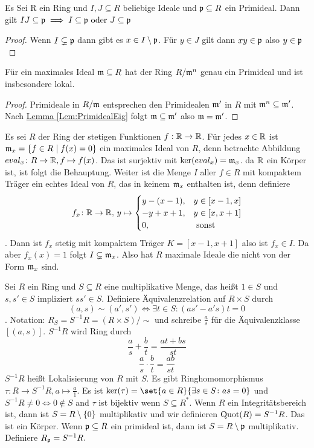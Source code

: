 \begin{Lemma}\label{Lem:PrimidealEig}
    Es Sei R ein Ring und $I,J\subseteq R$ beliebige Ideale und $\mathfrak{p}\subseteq R$ ein Primideal. Dann gilt 
    $IJ\subseteq \mathfrak{p}\implies I\subseteq\mathfrak{p} \text{ oder } J\subseteq\mathfrak{p}$
\end{Lemma}
\begin{proof}
    Wenn $I\subsetneq \mathfrak{p}$ dann gibt es $x\in I\setminus\mathfrak{p}$. Für $y\in J$ gilt dann $xy\in\mathfrak{p}$ also $y\in\mathfrak{p}$
\end{proof}
\begin{Kor}
    Für ein maximales Ideal $\mathfrak{m}\subseteq R$ hat der Ring $R/\mathfrak{m}^n$ genau ein Primideal und ist insbesondere lokal.
\end{Kor}
\begin{proof}
    Primideale in $R/\mathfrak{m}$ entsprechen den Primidealen $\mathfrak{m}'$ in $R$ mit $\mathfrak{m}^n\subseteq \mathfrak{m}'$. Nach \hyperref[Lem:PrimidealEig]{Lemma \ref{Lem:PrimidealEig}} folgt $\mathfrak{m}\subseteq \mathfrak{m}'$ also $\mathfrak{m}=\mathfrak{m}'$. 
\end{proof}
\begin{Bsp}
    Es sei $R$ der Ring der stetigen Funktionen $f:\mathbb{R}\to \mathbb{R}$. Für jedes $x\in \mathbb{R}$ ist $\mathfrak{m}_x=\{f\in R\mid f(x)=0\}$ ein maximales Ideal von $R$, denn betrachte Abbildung $eval_x\colon R\to \mathbb{R}, f\mapsto f(x)$. Das ist surjektiv mit $\ker(eval_x)=\mathfrak{m}_x$. da $\mathbb{R}$ ein Körper ist, ist folgt die Behauptung.
    Weiter ist die Menge $I$ aller $f\in R$ mit kompaktem Träger ein echtes Ideal von $R$, das in keinem $\mathfrak{m}_x$ enthalten ist, denn definiere $$f_x\colon \mathbb{R}\to \mathbb{R},\, y\mapsto \begin{cases}
        y-(x-1), & y\in[x-1,x]\\
        -y+x+1, & y\in [x,x+1]\\
        0, & \text{ sonst }
    \end{cases}$$. Dann ist $f_x$ stetig mit kompaktem Träger $K=[x-1,x+1]$ also ist $f_x\in I$. Da aber $f_x(x)=1$ folgt $I\subsetneq \mathfrak{m}_x$. Also hat $R$ maximale Ideale die nicht von der Form $\mathfrak{m}_x$ sind.
\end{Bsp}
\begin{Def}
    Sei $R$ ein Ring und $S\subseteq R$ eine multiplikative Menge, das heißt $1\in S$ und $s,s'\in S$ impliziert $ss'\in S$.
    Definiere Äquivalenzrelation auf $R\times S$ durch $$(a,s)\sim (a',s')\iff \exists t\in S\colon (as'-a's)t=0$$. Notation: $R_S=S^{-1}R=(R\times S)/\sim$ und schreibe $\frac a s$ für die Äquivalenzklasse $[(a,s)]$.
    $S^{-1}R$ wird Ring durch 
    $$\frac a s+\frac b t=\frac{at+bs}{st}$$
    $$\frac a s\cdot \frac b t=\frac{ab}{st}$$
    $S^{-1}R$ heißt Lokalisierung von $R$ mit $S$.
    Es gibt Ringhomomorphismus $\tau:R\to S^{-1}R,a\mapsto \frac a 1$.
    Es ist $\ker(\tau)=\set{ a\in R}{\exists s\in S\colon as=0}$ und $S^{-1}R\neq 0 \iff 0\not\in S$ and $\tau $ ist bijektiv wenn $S\subseteq R^*$.
    Wenn $R$ ein Integritätsbereich ist, dann ist $S=R\setminus\{0\}$ multiplikativ und wir definieren $\operatorname{Quot}(R)=S^{-1}R$. Das ist ein Körper.
    Wenn $\mathfrak{p}\subseteq R$ ein primideal ist, dann ist $S=R\setminus\mathfrak{p}$ multiplikativ. Definiere $R_{\mathfrak{p}}=S^{-1}R.$
\end{Def}
